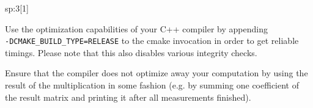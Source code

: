 \begin{samproblem}
\begin{subproblem}{sp:3}[1]
  \begin{samhint}
    Use the optimization capabilities of your C++ compiler by appending \\ \lstinline[style=cppsimple]|-DCMAKE_BUILD_TYPE=RELEASE| to the cmake invocation in order to get reliable timings. Please note that this also disables various integrity checks.
  \end{samhint}
  \begin{samhint}
    Ensure that the compiler does not optimize away your computation by using the result of the multiplication in some fashion (e.g. by summing one coefficient of the result matrix and printing it after all measurements finished).
  \end{samhint}
\end{subproblem}

\end{samproblem}
